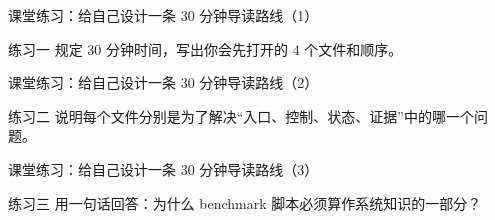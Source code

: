 \begin{frame}{课堂练习：给自己设计一条 30 分钟导读路线（1）}
\begin{block}{练习一}
    规定 30 分钟时间，写出你会先打开的 4 个文件和顺序。
  \end{block}
\end{frame}

\begin{frame}{课堂练习：给自己设计一条 30 分钟导读路线（2）}
\begin{block}{练习二}
    说明每个文件分别是为了解决“入口、控制、状态、证据”中的哪一个问题。
  \end{block}
\end{frame}

\begin{frame}{课堂练习：给自己设计一条 30 分钟导读路线（3）}
\begin{block}{练习三}
    用一句话回答：为什么 benchmark 脚本必须算作系统知识的一部分？
  \end{block}
\end{frame}
